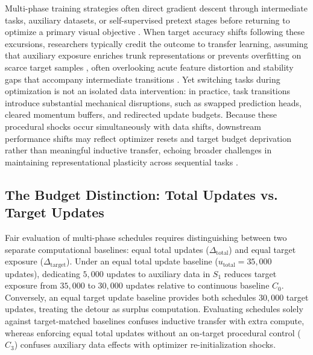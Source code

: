 \documentclass[10pt]{article}
\begin{document}
Multi-phase training strategies often direct gradient descent through intermediate tasks, auxiliary datasets, or self-supervised pretext stages before returning to optimize a primary visual objective \cite{caruana1997multitask,phang2018stilts,pruksachatkun2020intermediate,kirkpatrick2017overcoming,rebuffi2017icarl,davari2022probing,mayo2023multitask,chaves2026benchmarking}. When target accuracy shifts following these excursions, researchers typically credit the outcome to transfer learning, assuming that auxiliary exposure enriches trunk representations or prevents overfitting on scarce target samples \cite{yosinski2014transferable,aghajanyan2021muppet}, often overlooking acute feature distortion and stability gaps that accompany intermediate transitions \cite{kumar2022finetuning,lapacz2025exploring}. Yet switching tasks during optimization is not an isolated data intervention: in practice, task transitions introduce substantial mechanical disruptions, such as swapped prediction heads, cleared momentum buffers, and redirected update budgets. Because these procedural shocks occur simultaneously with data shifts, downstream performance shifts may reflect optimizer resets and target budget deprivation rather than meaningful inductive transfer, echoing broader challenges in maintaining representational plasticity across sequential tasks \cite{lyle2023plasticity,dohare2024continual}.

\subsection{The Budget Distinction: Total Updates vs. Target Updates}\label{subsec:intro_budgets}

Fair evaluation of multi-phase schedules requires distinguishing between two separate computational baselines: equal total updates ($\Delta_{\mathrm{total}}$) and equal target exposure ($\Delta_{\mathrm{target}}$). Under an equal total update baseline ($u_{\mathrm{total}} = 35{,}000$ updates), dedicating $5{,}000$ updates to auxiliary data in $S_1$ reduces target exposure from $35{,}000$ to $30{,}000$ updates relative to continuous baseline $C_0$. Conversely, an equal target update baseline provides both schedules $30{,}000$ target updates, treating the detour as surplus computation. Evaluating schedules solely against target-matched baselines confuses inductive transfer with extra compute, whereas enforcing equal total updates without an on-target procedural control ($C_3$) confuses auxiliary data effects with optimizer re-initialization shocks.
\end{document}

